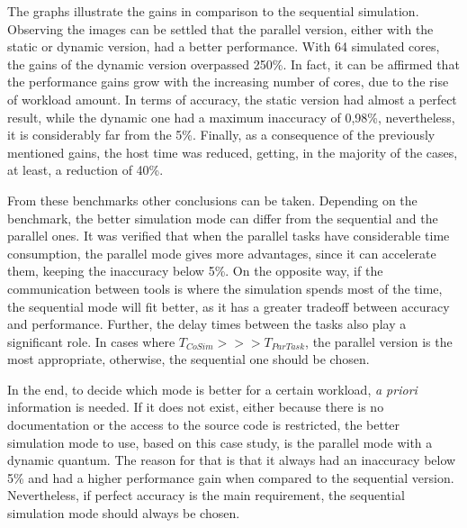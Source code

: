 The graphs illustrate the gains in comparison to the sequential simulation. Observing the images can be settled that the parallel version, either 
with the static or dynamic version, had a better performance. With 64 simulated cores, the gains of the dynamic version overpassed 250\%. 
In fact, it can be affirmed that the performance gains grow with the increasing number of cores, due to the rise of workload amount. 
In terms of accuracy, the static version had almost a perfect result, while the dynamic one had 
a maximum inaccuracy of 0,98\%, nevertheless, it is considerably far from the 5\%. Finally, as a consequence of the previously mentioned gains,
the host time was reduced, getting, in the majority of the cases, at least, a reduction of 40\%. 


From these benchmarks other conclusions can be taken. Depending on the benchmark, the better simulation mode can differ from the sequential and
the parallel ones. It was verified that when the parallel tasks have considerable time consumption, the parallel mode gives more advantages, 
since it can accelerate them, keeping the inaccuracy below 5\%. On the opposite way, if the communication between tools is where the simulation 
spends most of the time, the sequential mode will fit better, as it has a greater tradeoff between accuracy and performance. Further, the delay
times between the tasks also play a significant role. In cases where $T_{CoSim} >>> T_{ParTask}$, the parallel version is the most appropriate, 
otherwise, the sequential one should be chosen. 

In the end, to decide which mode is better for a certain workload, \textit{a priori} information is needed.
If it does not exist, either because there is no documentation or the access to the source code is restricted, the better simulation mode to use, 
based on this case study, is the parallel mode with a dynamic quantum. The reason for that is that it always had an inaccuracy below 5\% and 
had a higher performance gain when compared to the sequential version. Nevertheless, if perfect accuracy is the main requirement, the 
sequential simulation mode should always be chosen.




